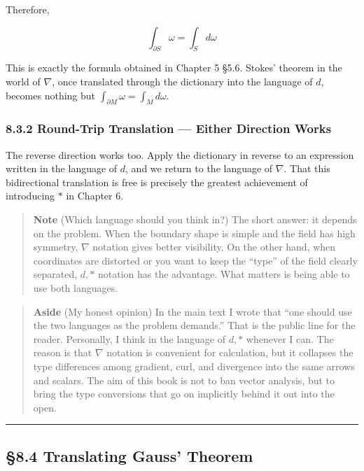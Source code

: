 Therefore,

\[\int_{\partial S} \omega = \int_S d\omega\]

This is exactly the formula obtained in Chapter 5 §5.6. Stokes' theorem
in the world of \(\nabla\), once translated through the dictionary into
the language of \(d\), becomes nothing but
\(\int_{\partial M}\omega = \int_M d\omega\).

\hypertarget{round-trip-translation-either-direction-works}{%
\subsubsection{8.3.2 Round-Trip Translation --- Either Direction
Works}\label{round-trip-translation-either-direction-works}}

The reverse direction works too. Apply the dictionary in reverse to an
expression written in the language of \(d\), and we return to the
language of \(\nabla\). That this bidirectional translation is free is
precisely the greatest achievement of introducing \(\ast\) in Chapter 6.

\begin{quote}
\textbf{Note} (Which language should you think in?) The short answer: it
depends on the problem. When the boundary shape is simple and the field
has high symmetry, \(\nabla\) notation gives better visibility. On the
other hand, when coordinates are distorted or you want to keep the
``type'' of the field clearly separated, \(d,\ast\) notation has the
advantage. What matters is being able to use both languages.
\end{quote}

\begin{quote}
\textbf{Aside} (My honest opinion) In the main text I wrote that ``one
should use the two languages as the problem demands.'' That is the
public line for the reader. Personally, I think in the language of
\(d,\ast\) whenever I can. The reason is that \(\nabla\) notation is
convenient for calculation, but it collapses the type differences among
gradient, curl, and divergence into the same arrows and scalars. The aim
of this book is not to ban vector analysis, but to bring the type
conversions that go on implicitly behind it out into the open.
\end{quote}

\begin{center}\rule{0.5\linewidth}{0.5pt}\end{center}

\hypertarget{translating-gauss-theorem}{%
\subsection{§8.4 Translating Gauss'
Theorem}\label{translating-gauss-theorem}}

